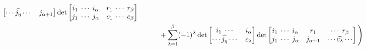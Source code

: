 \documentclass{amsart}
\begin{document}
{{\begin{align}
\begin{bmatrix}
                \cdots\widehat{j_\eta}\cdots&j_{\alpha+1}
            \end{bmatrix}\det\begin{bmatrix}
                i_1\;\cdots\;i_\alpha&r_1\;\cdots\;r_\beta\\
                j_1\;\cdots\;j_\alpha&c_1\;\cdots\;c_\beta
            \end{bmatrix}\\
            &\hspace{3eM}+\sum_{\lambda=1}^\beta(-1)^\lambda\det\begin{bmatrix}
                i_1\;\cdots&i_\alpha\\
                \cdots\widehat{j_\eta}\cdots&c_\lambda
            \end{bmatrix}\det\begin{bmatrix}
                i_1\;\cdots\;i_\alpha&r_1&\cdots\;r_\beta\\
                j_1\;\cdots\;j_\alpha&j_{\alpha+1}&\cdots\widehat{c_\lambda}\cdots
            \end{bmatrix}\Bigg)
        \end{align}
    }

}
\end{document}
